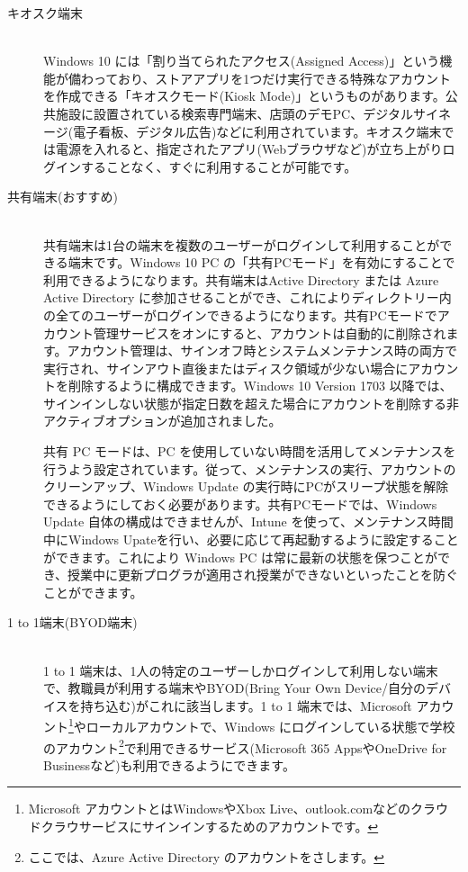 \begin{description}
    \item[キオスク端末]\mbox{}\\
    Windows 10 には「割り当てられたアクセス(Assigned Access)」という機能が備わっており、ストアアプリを1つだけ実行できる特殊なアカウントを作成できる「キオスクモード(Kiosk Mode)」というものがあります。公共施設に設置されている検索専門端末、店頭のデモPC、デジタルサイネージ(電子看板、デジタル広告)などに利用されています。キオスク端末では電源を入れると、指定されたアプリ(Webブラウザなど)が立ち上がりログインすることなく、すぐに利用することが可能です。
    \item[共有端末(おすすめ)] \mbox{}\\
    共有端末は1台の端末を複数のユーザーがログインして利用することができる端末です。Windows 10 PC の「共有PCモード」を有効にすることで利用できるようになります。共有端末はActive Directory または Azure Active Directory に参加させることができ、これによりディレクトリー内の全てのユーザーがログインできるようになります。共有PCモードでアカウント管理サービスをオンにすると、アカウントは自動的に削除されます。アカウント管理は、サインオフ時とシステムメンテナンス時の両方で実行され、サインアウト直後またはディスク領域が少ない場合にアカウントを削除するように構成できます。Windows 10 Version 1703 以降では、サインインしない状態が指定日数を超えた場合にアカウントを削除する非アクティブオプションが追加されました。

    共有 PC モードは、PC を使用していない時間を活用してメンテナンスを行うよう設定されています。従って、メンテナンスの実行、アカウントのクリーンアップ、Windows Update の実行時にPCがスリープ状態を解除できるようにしておく必要があります。共有PCモードでは、Windows Update 自体の構成はできませんが、Intune を使って、メンテナンス時間中にWindows Upateを行い、必要に応じて再起動するように設定することができます。これにより Windows PC は常に最新の状態を保つことができ、授業中に更新プログラが適用され授業ができないといったことを防ぐことができます。
    \item[1 to 1端末(BYOD端末)] \mbox{}\\
    1 to 1 端末は、1人の特定のユーザーしかログインして利用しない端末で、教職員が利用する端末やBYOD(Bring Your Own Device/自分のデバイスを持ち込む)がこれに該当します。1 to 1 端末では、Microsoft アカウント\footnote{Microsoft アカウントとはWindowsやXbox Live、outlook.comなどのクラウドクラウサービスにサインインするためのアカウントです。}やローカルアカウントで、Windows にログインしている状態で学校のアカウント\footnote{ここでは、Azure Active Directory のアカウントをさします。}で利用できるサービス(Microsoft 365 AppsやOneDrive for Businessなど)も利用できるようにできます。
\end{description}

